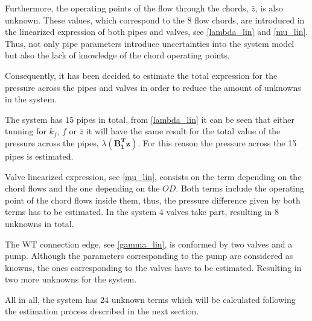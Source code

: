 %


Furthermore, the operating points of the flow through the chords, $\bar{z}$, is also unknown. These values, which correspond to the $8$ flow chords, are introduced in the linearized expression of both pipes 
and valves, see \eqref{lambda_lin} and \eqref{mu_lin}. Thus, not only pipe parameters introduce uncertainties into the system model but also the lack of knowledge of the chord operating points.

Consequently, it has been decided to estimate the total expression for the pressure across the pipes and valves in order to reduce the amount of unknowns in the system.

The system has $15$ pipes in total,  from \eqref{lambda_lin} it can be seen that either tunning for $k_f$, $f$ or $\bar{z}$ it will have the same result for the total
value of the pressure across the pipes, $\lambda(\pmb{{B_1^{T}}}\pmb{z})$. For this reason the pressure across the 15 pipes is estimated.

Valve linearized expression, see \eqref{mu_lin}, consists on the term depending on the chord flows and the one depending on the $OD$. Both terms include the operating 
point of the chord flows inside them, thus, the pressure difference given by both terms has to be estimated. In the system 4 valves take part, 
resulting in 8 unknowns in total. 

The WT connection edge, see \eqref{gamma_lin}, is conformed by two valves and a pump. Although the parameters corresponding to the pump are considered as knowns, the ones 
corresponding to the valves have to be estimated. Resulting in two more unknowns for the system. 

All in all, the system has $24$ unknown terms which will be calculated following the estimation process described in the next section.